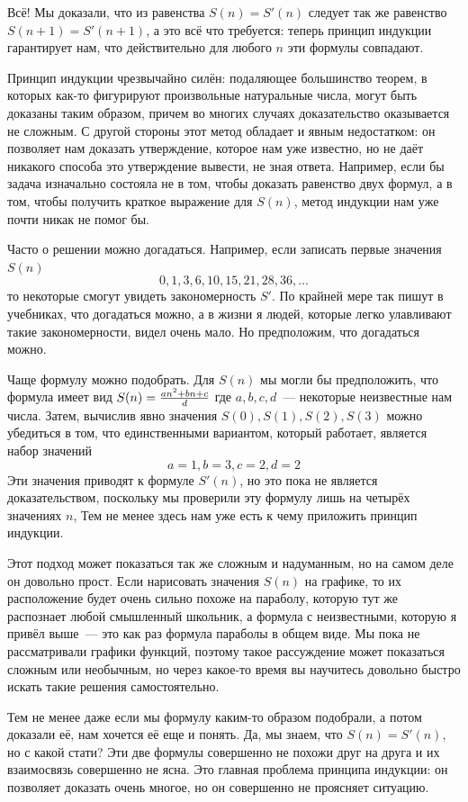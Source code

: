 Всё! Мы доказали, что из равенства $S(n)=S'(n)$ следует так же равенство $S(n+1)=S'(n+1)$, а это всё что требуется: теперь принцип индукции гарантирует нам, что действительно для любого $n$ эти формулы совпадают.

Принцип индукции чрезвычайно силён: подаляющее большинство теорем, в которых как-то фигурируют произвольные натуральные числа, могут быть доказаны таким образом, причем во многих случаях доказательство оказывается не сложным. С другой стороны этот метод обладает и явным недостатком: он позволяет нам доказать утверждение, которое нам уже известно, но не даёт никакого способа это утверждение вывести, не зная ответа. Например, если бы задача изначально состояла не в том, чтобы доказать равенство двух формул, а в том, чтобы получить краткое выражение для $S(n)$, метод индукции нам уже почти никак не помог бы.

Часто о решении можно догадаться. Например, если записать первые значения $S(n)$
$$0, 1, 3, 6, 10, 15, 21, 28, 36, \ldots$$
то некоторые смогут увидеть закономерность $S'$. По крайней мере так пишут в учебниках, что догадаться можно, а в жизни я людей, которые легко улавливают такие закономерности, видел очень мало. Но предположим, что догадаться можно.

Чаще формулу можно подобрать. Для $S(n)$ мы могли бы предположить, что формула имеет вид
$S(n) = {an^2 + bn + c\over d}$
где $a, b, c, d$~--- некоторые неизвестные нам числа. Затем, вычислив явно значения $S(0), S(1), S(2), S(3)$ можно убедиться в том, что единственными вариантом, который работает, является набор значений
$$a=1, b=3, c=2, d=2$$
Эти значения приводят к формуле $S'(n)$, но это пока не является доказательством, поскольку мы проверили эту формулу лишь на четырёх значениях $n$, Тем не менее здесь нам уже есть к чему приложить принцип индукции.

Этот подход может показаться так же сложным и надуманным, но на самом деле он довольно прост. Если нарисовать значения $S(n)$ на графике, то их расположение будет очень сильно похоже на параболу, которую тут же распознает любой смышленный школьник, а формула с неизвестными, которую я привёл выше~--- это как раз формула параболы в общем виде. Мы пока не рассматривали графики функций, поэтому такое рассуждение может показаться сложным или необычным, но через какое-то время вы научитесь довольно быстро искать такие решения самостоятельно.

Тем не менее даже если мы формулу каким-то образом подобрали, а потом доказали её, нам хочется её еще и понять. Да, мы знаем, что $S(n)=S'(n)$, но с какой стати? Эти две формулы совершенно не похожи друг на друга и их взаимосвязь совершенно не ясна. Это главная проблема принципа индукции: он позволяет доказать очень многое, но он совершенно не проясняет ситуацию.

